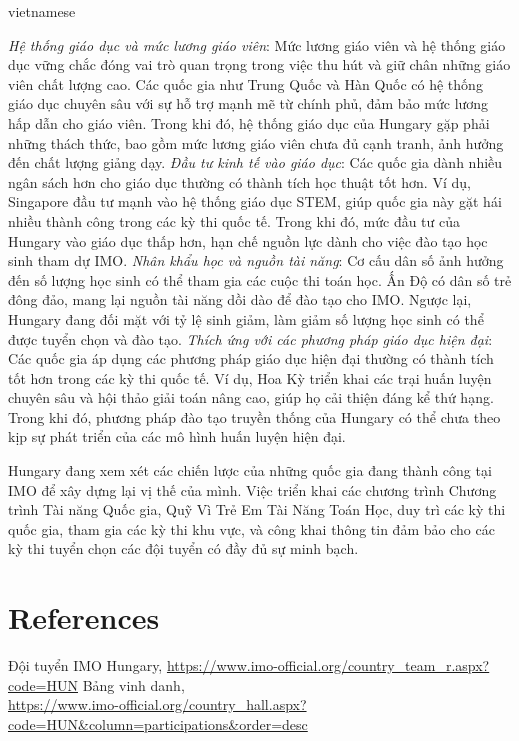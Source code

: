 \documentclass{article}
\begin{document}
\begin{otherlanguage*}{vietnamese}
\begin{itemize}[topsep=0pt, partopsep=0pt, itemsep=0pt]
    \ii \textit{Hệ thống giáo dục và mức lương giáo viên}: Mức lương giáo viên và hệ thống giáo dục vững chắc đóng vai trò quan trọng trong việc thu hút
    và giữ chân những giáo viên chất lượng cao.
    Các quốc gia như Trung Quốc và Hàn Quốc có hệ thống giáo dục chuyên sâu với sự hỗ trợ mạnh mẽ từ chính phủ, đảm bảo mức lương hấp dẫn cho giáo viên.
    Trong khi đó, hệ thống giáo dục của Hungary gặp phải những thách thức, bao gồm mức lương giáo viên chưa đủ cạnh tranh, ảnh hưởng đến chất lượng giảng dạy.
    \ii \textit{Đầu tư kinh tế vào giáo dục}: Các quốc gia dành nhiều ngân sách hơn cho giáo dục thường có thành tích học thuật tốt hơn.
    Ví dụ, Singapore đầu tư mạnh vào hệ thống giáo dục STEM, giúp quốc gia này gặt hái nhiều thành công trong các kỳ thi quốc tế.
    Trong khi đó, mức đầu tư của Hungary vào giáo dục thấp hơn, hạn chế nguồn lực dành cho việc đào tạo học sinh tham dự IMO.
    \ii \textit{Nhân khẩu học và nguồn tài năng}: Cơ cấu dân số ảnh hưởng đến số lượng học sinh có thể tham gia các cuộc thi toán học.
    Ấn Độ có dân số trẻ đông đảo, mang lại nguồn tài năng dồi dào để đào tạo cho IMO.
    Ngược lại, Hungary đang đối mặt với tỷ lệ sinh giảm, làm giảm số lượng học sinh có thể được tuyển chọn và đào tạo.
    \ii \textit{Thích ứng với các phương pháp giáo dục hiện đại}: Các quốc gia áp dụng các phương pháp giáo dục hiện đại thường có thành tích tốt hơn trong các kỳ thi quốc tế.
    Ví dụ, Hoa Kỳ triển khai các trại huấn luyện chuyên sâu và hội thảo giải toán nâng cao, giúp họ cải thiện đáng kể thứ hạng.
    Trong khi đó, phương pháp đào tạo truyền thống của Hungary có thể chưa theo kịp sự phát triển của các mô hình huấn luyện hiện đại.
\end{itemize}

Hungary đang xem xét các chiến lược của những quốc gia đang thành công tại IMO để xây dựng lại vị thế của mình.
Việc triển khai các chương trình Chương trình Tài năng Quốc gia, Quỹ Vì Trẻ Em Tài Năng Toán Học, duy trì các kỳ thi quốc gia, tham gia các kỳ thi khu vực,
và công khai thông tin đảm bảo cho các kỳ thi tuyển chọn các đội tuyển có đầy đủ sự minh bạch.

\newpage

\section*{References}

\begin{thebibliography}{99}
     Đội tuyển IMO Hungary, \url{https://www.imo-official.org/country_team_r.aspx?code=HUN}
     Bảng vinh danh,\\ \url{https://www.imo-official.org/country_hall.aspx?code=HUN&column=participations&order=desc}
\end{thebibliography}

\end{otherlanguage*}
\end{document}
